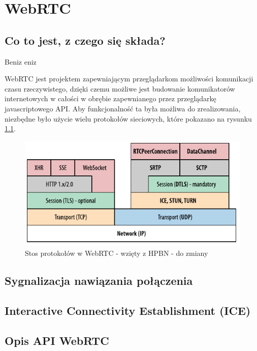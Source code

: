 
\chapter{WebRTC}

\section{Co to jest, z czego się składa?}

Beniz \cite{hpbn} eniz

WebRTC jest projektem zapewniającym przeglądarkom możliwości komunikacji czasu rzeczywistego, dzięki czemu możliwe jest
budowanie komunikatorów internetowych w całości w obrębie zapewnianego przez przeglądarkę javascriptowego API. Aby
funkcjonalność ta była możliwa do zrealizowania, niezbędne było użycie wielu protokołów sieciowych, które pokazano
na rysunku \ref{fig:webrtc_stack}.

\begin{figure}[htbp]
	\centering
	\includegraphics{img/webrtc-stack_hpbn}
	\caption{Stos protokołów w WebRTC - wzięty z HPBN - do zmiany}
	\label{fig:webrtc_stack}
\end{figure}

\section{Sygnalizacja nawiązania połączenia}


\section{Interactive Connectivity Establishment (ICE)}

\section{Opis API WebRTC}

